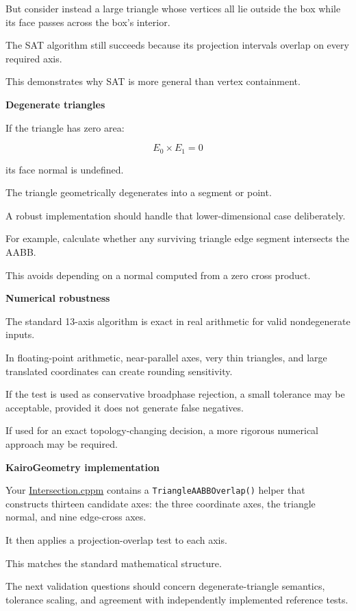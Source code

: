 But consider instead a large triangle whose vertices all lie outside the box while its face passes across the box's interior.

The SAT algorithm still succeeds because its projection intervals overlap on every required axis.

This demonstrates why SAT is more general than vertex containment.

\textbf{Degenerate triangles}

If the triangle has zero area:

\[
E_0\times E_1=0
\]

its face normal is undefined.

The triangle geometrically degenerates into a segment or point.

A robust implementation should handle that lower-dimensional case deliberately.

For example, calculate whether any surviving triangle edge segment intersects the AABB.

This avoids depending on a normal computed from a zero cross product.

\textbf{Numerical robustness}

The standard 13-axis algorithm is exact in real arithmetic for valid nondegenerate inputs.

In floating-point arithmetic, near-parallel axes, very thin triangles, and large translated coordinates can create rounding sensitivity.

If the test is used as conservative broadphase rejection, a small tolerance may be acceptable, provided it does not generate false negatives.

If used for an exact topology-changing decision, a more rigorous numerical approach may be required.

\textbf{KairoGeometry implementation}

Your \href{https://github.com/swayam8624/KairoGeometry/blob/master/Intersection.cppm?utm_source=chatgpt.com}{Intersection.cppm} contains a \texttt{TriangleAABBOverlap()} helper that constructs thirteen candidate axes: the three coordinate axes, the triangle normal, and nine edge-cross axes.

It then applies a projection-overlap test to each axis.

This matches the standard mathematical structure.

The next validation questions should concern degenerate-triangle semantics, tolerance scaling, and agreement with independently implemented reference tests.

